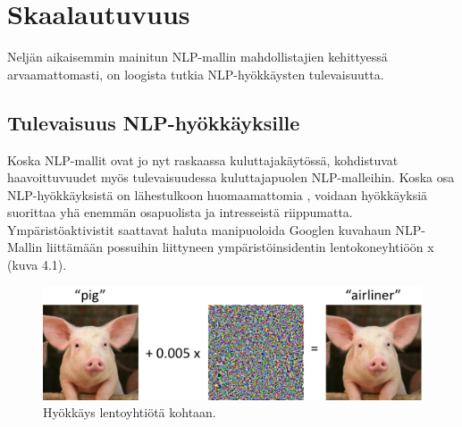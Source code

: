 \chapter{Skaalautuvuus\label{discussion}}
Neljän aikaisemmin mainitun NLP-mallin mahdollistajien kehittyessä arvaamattomasti, on loogista tutkia NLP-hyökkäysten tulevaisuutta. 
\section{Tulevaisuus NLP-hyökkäyksille}
Koska NLP-mallit ovat jo nyt raskaassa kuluttajakäytössä, kohdistuvat haavoittuvuudet myös tulevaisuudessa kuluttajapuolen NLP-malleihin. Koska osa NLP-hyökkäyksistä on lähestulkoon huomaamattomia \citep{DBLP:journals/corr/abs-2111-07970}, voidaan hyökkäyksiä suorittaa yhä enemmän osapuolista ja intresseistä riippumatta. Ympäristöaktivistit saattavat haluta manipuoloida Googlen kuvahaun NLP-Mallin liittämään possuihin liittyneen ympäristöinsidentin lentokoneyhtiöön x (kuva 4.1).
\begin{figure}[ht]
  \includegraphics[scale=0.4]{figures/piggie.png}
  \caption{Hyökkäys lentoyhtiötä kohtaan. \citep{adversexamples}}
\end{figure}